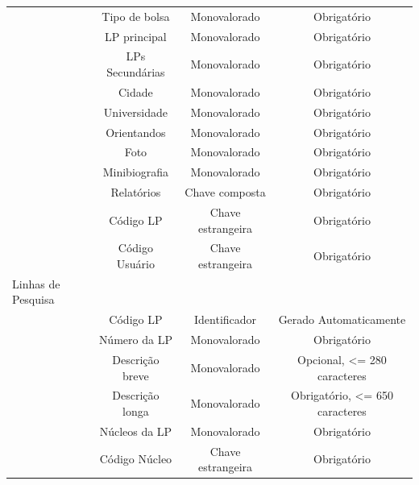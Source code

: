 \documentclass[11pt]{../../classes/ifscarticle}
\begin{document}
\begin{table}[h]
\begin{tabular}{l|c|c|c|}
                  & Tipo de bolsa       & Monovalorado      & Obrigatório                                          \\
                  & LP principal        & Monovalorado      & Obrigatório                                          \\
                  & LPs Secundárias     & Monovalorado      & Obrigatório                                          \\
                  & Cidade              & Monovalorado      & Obrigatório                                          \\
                  & Universidade        & Monovalorado      & Obrigatório                                          \\
                  & Orientandos         & Monovalorado      & Obrigatório                                          \\
                  & Foto                & Monovalorado      & Obrigatório                                          \\
                  & Minibiografia       & Monovalorado      & Obrigatório                                          \\
                  & Relatórios          & Chave composta    & Obrigatório                                          \\
                  & Código LP           & Chave estrangeira & Obrigatório                                          \\
                  & Código Usuário      & Chave estrangeira & Obrigatório                                          \\
    \hline
    Linhas de Pesquisa \\
                  & Código LP       & Identificador     & Gerado Automaticamente         \\
                  & Número da LP    & Monovalorado      & Obrigatório                    \\
                  & Descrição breve & Monovalorado      & Opcional, <= 280 caracteres    \\
                  & Descrição longa & Monovalorado      & Obrigatório, <= 650 caracteres \\
                  & Núcleos da LP   & Monovalorado      & Obrigatório                    \\
                  & Código Núcleo   & Chave estrangeira & Obrigatório                    \\

\end{tabular}
\end{table}
\end{document}
